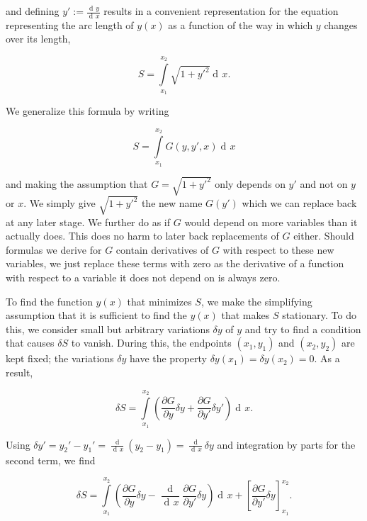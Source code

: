 \documentclass{article}
\DeclareMathOperator{\dd}{d\!}
\DeclareMathOperator{\ddd}{\mathrm{d}}
\begin{document}
and defining $y' := \frac{\dd y}{\dd x}$ results in a convenient representation for the equation representing the arc length of $y(x)$ as a function of the way in which $y$ changes over its length, %

\begin{equation}
S = \int\limits_{x_1}^{x_2}\sqrt{1 + y'^2} \dd x.
\end{equation}

We generalize this formula by writing

\begin{equation}
S=\int\limits_{x_1}^{x_2} G(y,y',x) \dd x
\end{equation}



and making the assumption that $G = \sqrt{1 + y'^2}$ only depends on $y'$ and not on $y$ or $x$. We simply give $\sqrt{1+y'^2}$ the new name $G(y')$ which we can replace back at any later stage. We further do as if $G$ would depend on more variables than it actually does. This does no harm to later back replacements of $G$ either. Should formulas we derive for $G$ contain derivatives of $G$ with respect to these new variables, we just replace these terms with zero as the derivative of a function with respect to a variable it does not depend on is always zero. %

To find the function $y(x)$ that minimizes $S$, we make the simplifying assumption that it is sufficient to find the $y(x)$ that makes $S$ stationary. To do this, we consider small but arbitrary variations $\delta y$ of $y$ and try to find a condition that causes $\delta S$ to vanish. During this, the endpoints $(x_1,y_1)$ and $(x_2,y_2)$ are kept fixed; the variations $\delta y$ have the property $\delta y(x_1) = \delta y(x_2) = 0$. As a result,

\begin{equation}
\delta S = \int\limits_{x_1}^{x_2} \left(\frac{\partial G}{\partial y} \delta y
+ \frac{\partial G}{\partial y'} \delta y' \right) \dd x.
\end{equation}

Using $\delta y' = y_2' - y_1' = \frac{\ddd }{\dd x}(y_2 - y_1) = \frac{\ddd}{\dd x} \delta y$ and integration by parts for the second term, we find

\begin{equation}
\delta S = \int\limits_{x_1}^{x_2} \left( \frac{\partial G}{\partial y} \delta y
- \frac{\ddd}{\dd x}\frac{\partial G}{\partial y'} \delta y \right) \dd x
+ \left[\frac{\partial G}{\partial y'} \delta y \right]_{x_1}^{x_2}.
\end{equation}
\end{document}
